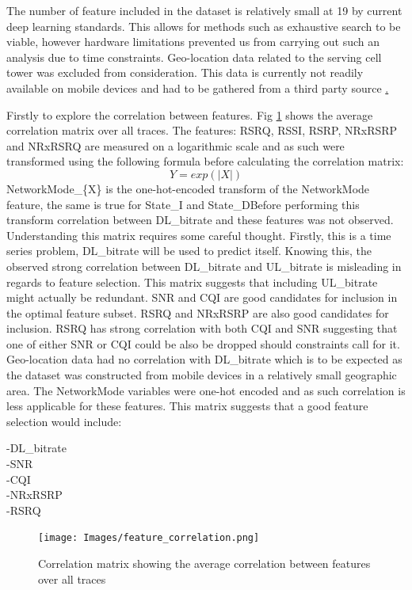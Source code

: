 The number of feature included in the dataset is relatively small at 19 by current deep learning standards. This allows for methods such as exhaustive search to be viable, however hardware limitations prevented us from carrying out such an analysis due to time constraints. Geo-location data related to the serving cell tower was excluded from consideration. This data is currently not readily available on mobile devices and had to be gathered from a third party source \href{https://opencellid.org/}.

Firstly to explore the correlation between features. Fig \ref{fig:feature_correlation} shows the average correlation matrix over all traces. The features: RSRQ, RSSI, RSRP, NRxRSRP and NRxRSRQ are measured on a logarithmic scale and as such were transformed using the following formula before calculating the correlation matrix:
\begin{equation}
Y = exp(\left|X\right|)
\end{equation}
NetworkMode\_\{X\} is the one-hot-encoded transform of the NetworkMode feature, the same is true for State\_I and State\_DBefore performing this transform correlation between DL\_bitrate and these features was not observed. Understanding this matrix requires some careful thought. Firstly, this is a time series problem, DL\_bitrate will be used to predict itself. Knowing this, the observed strong correlation between DL\_bitrate and UL\_bitrate is misleading in regards to feature selection. This matrix suggests that including UL\_bitrate might actually be redundant. SNR and CQI are good candidates for inclusion in the optimal feature subset. RSRQ and NRxRSRP are also good candidates for inclusion. RSRQ has strong correlation with both CQI and SNR suggesting that one of either SNR or CQI could be also be dropped should constraints call for it. Geo-location data had no correlation with DL\_bitrate which is to be expected as the dataset was constructed from mobile devices in a relatively small geographic area. The NetworkMode variables were one-hot encoded and as such correlation is less applicable for these features. This matrix suggests that a good feature selection would include:

-DL\_bitrate \\
-SNR \\
-CQI \\
-NRxRSRP \\
-RSRQ \\

\newpage
\begin{figure}[h]
\texttt{[image: Images/feature\_correlation.png]}
\centering
\caption{Correlation matrix showing the average correlation between features over all traces}
\label{fig:feature_correlation}
\end{figure}

